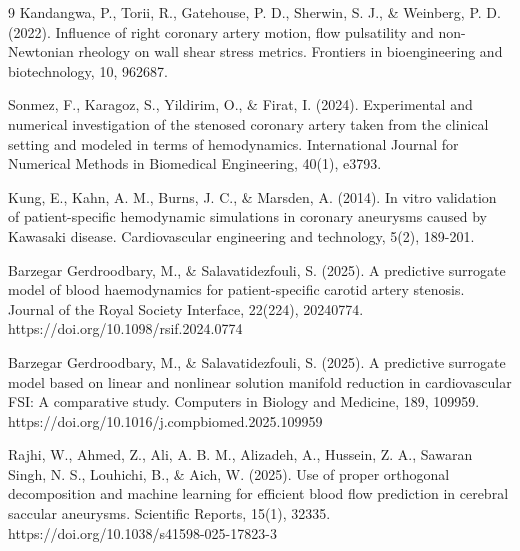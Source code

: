 \documentclass[11pt]{article}
\begin{document}
\begin{thebibliography}{9}
Kandangwa, P., Torii, R., Gatehouse, P. D., Sherwin, S. J., \& Weinberg, P. D. (2022). Influence of right coronary artery motion, flow pulsatility and non-Newtonian rheology on wall shear stress metrics. Frontiers in bioengineering and biotechnology, 10, 962687.


Sonmez, F., Karagoz, S., Yildirim, O., \& Firat, I. (2024). Experimental and numerical investigation of the stenosed coronary artery taken from the clinical setting and modeled in terms of hemodynamics. International Journal for Numerical Methods in Biomedical Engineering, 40(1), e3793.

Kung, E., Kahn, A. M., Burns, J. C., \& Marsden, A. (2014). In vitro validation of patient-specific hemodynamic simulations in coronary aneurysms caused by Kawasaki disease. Cardiovascular engineering and technology, 5(2), 189-201.

Barzegar Gerdroodbary, M., \& Salavatidezfouli, S. (2025). A predictive surrogate model of blood haemodynamics for patient-specific carotid artery stenosis. Journal of the Royal Society Interface, 22(224), 20240774. https://doi.org/10.1098/rsif.2024.0774

Barzegar Gerdroodbary, M., \& Salavatidezfouli, S. (2025). A predictive surrogate model based on linear and nonlinear solution manifold reduction in cardiovascular FSI: A comparative study. Computers in Biology and Medicine, 189, 109959. https://doi.org/10.1016/j.compbiomed.2025.109959

Rajhi, W., Ahmed, Z., Ali, A. B. M., Alizadeh, A., Hussein, Z. A., Sawaran Singh, N. S., Louhichi, B., \& Aich, W. (2025). Use of proper orthogonal decomposition and machine learning for efficient blood flow prediction in cerebral saccular aneurysms. Scientific Reports, 15(1), 32335. https://doi.org/10.1038/s41598-025-17823-3

\end{thebibliography}
\end{document}
